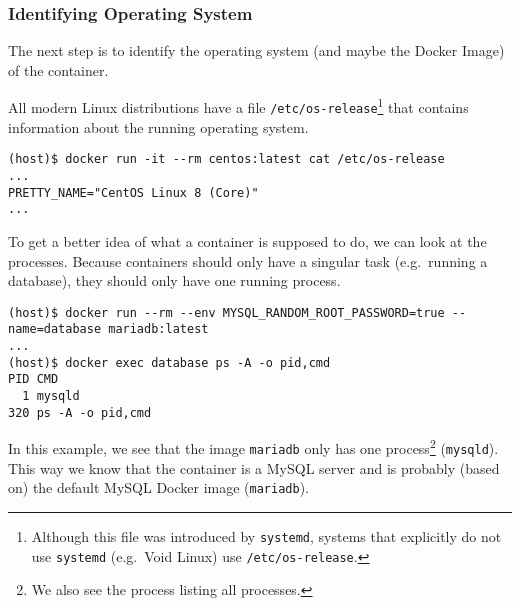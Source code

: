 \subsubsection{Identifying Operating System}

The next step is to identify the operating system (and maybe the Docker Image) of the container.

All modern Linux distributions have a file \lstinline{/etc/os-release}\footnote{Although this file was introduced by \lstinline{systemd}, systems that explicitly do not use \lstinline{systemd} (e.g.\ Void Linux) use \lstinline{/etc/os-release}.} that contains information about the running operating system.
\begin{lstlisting}[caption={CentOS container \lstinline{/etc/os-release}},captionpos=b]
(host)$ docker run -it --rm centos:latest cat /etc/os-release
...
PRETTY_NAME="CentOS Linux 8 (Core)"
...
\end{lstlisting}

To get a better idea of what a container is supposed to do, we can look at the processes. Because containers should only have a singular task (e.g.\ running a database), they should only have one running process. 

\begin{lstlisting}[caption={A container only has one process},captionpos=b]
(host)$ docker run --rm --env MYSQL_RANDOM_ROOT_PASSWORD=true --name=database mariadb:latest
...
(host)$ docker exec database ps -A -o pid,cmd
PID CMD
  1 mysqld
320 ps -A -o pid,cmd
\end{lstlisting}

In this example, we see that the image \lstinline{mariadb} only has one process\footnote{We also see the process listing all processes.} (\lstinline{mysqld}). This way we know that the container is a MySQL server and is probably (based on) the default MySQL Docker image (\lstinline{mariadb}).
